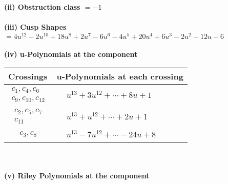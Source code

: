 \documentclass[1p]{elsarticle_modified}
\theoremstyle{definition}
\begin{document}
\flushleft \textbf{(ii) Obstruction class $= -1$}\\~\\
\flushleft \textbf{(iii) Cusp Shapes $= 4 u^{12}-2 u^{10}+18 u^8+2 u^7-6 u^6-4 u^5+20 u^4+6 u^3-2 u^2-12 u-6$}\\~\\
\newpage\renewcommand{\arraystretch}{1}
\flushleft \textbf{(iv) u-Polynomials at the component}\newline \\
\begin{tabular}{m{50pt}|m{274pt}}
Crossings & \hspace{64pt}u-Polynomials at each crossing \\
\hline $$\begin{aligned}c_{1},c_{4},c_{6}\\c_{9},c_{10},c_{12}\end{aligned}$$&$\begin{aligned}
&u^{13}+3 u^{12}+\cdots+8 u+1
\end{aligned}$\\
\hline $$\begin{aligned}c_{2},c_{5},c_{7}\\c_{11}\end{aligned}$$&$\begin{aligned}
&u^{13}+u^{12}+\cdots+2 u+1
\end{aligned}$\\
\hline $$\begin{aligned}c_{3},c_{8}\end{aligned}$$&$\begin{aligned}
&u^{13}-7 u^{12}+\cdots-24 u+8
\end{aligned}$\\
\hline
\end{tabular}\\~\\
\newpage\renewcommand{\arraystretch}{1}
\flushleft \textbf{(v) Riley Polynomials at the component}\newline \\
\end{document}
